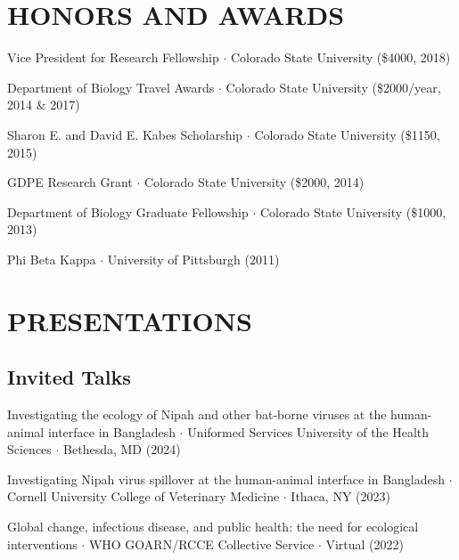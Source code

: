 \documentclass{cv}
\begin{document}


\section*{HONORS AND AWARDS}

Vice President for Research Fellowship $\cdot$ Colorado State University (\$4000, 2018)

Department of Biology Travel Awards $\cdot$ Colorado State University (\$2000/year, 2014 \& 2017)

Sharon E. and David E. Kabes Scholarship $\cdot$ Colorado State University (\$1150, 2015)

GDPE Research Grant $\cdot$ Colorado State University (\$2000, 2014) 

Department of Biology Graduate Fellowship $\cdot$ Colorado State University (\$1000, 2013)

Phi Beta Kappa $\cdot$ University of Pittsburgh (2011)



\section*{PRESENTATIONS}

\subsection*{Invited Talks}

Investigating the ecology of Nipah and other bat-borne viruses at the human-animal interface in Bangladesh $\cdot$ Uniformed Services University of the Health Sciences $\cdot$ Bethesda, MD (2024)

Investigating Nipah virus spillover at the human-animal interface in Bangladesh $\cdot$ Cornell University College of Veterinary Medicine $\cdot$ Ithaca, NY (2023)

Global change, infectious disease, and public health: the need for ecological interventions $\cdot$ WHO GOARN/RCCE Collective Service $\cdot$ Virtual (2022)
\end{document}
